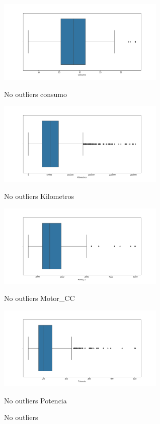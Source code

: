 \documentclass[12pt,twoside]{report}
\begin{document}
\begin{figure}[H]
\begin{multicols}{2}
\includegraphics[width=8cm]{../notebooks/figures/no_outlier_Consumo.png}
\caption{No outliers consumo}
\columnbreak
\includegraphics[width=8cm]{../notebooks/figures/no_outlier_Kilometros.png}
\caption{No outliers Kilometros}
\end{multicols}
\begin{multicols}{2}
\includegraphics[width=8cm]{../notebooks/figures/no_outlier_Motor_CC.png}
\caption{No outliers Motor\_CC}
\columnbreak
\includegraphics[width=8cm]{../notebooks/figures/no_outlier_Potencia.png}
\caption{No outliers Potencia}
\end{multicols}
\caption{No outliers}
\label{fig:no_outliers_data}
\end{figure} 
\end{document}
